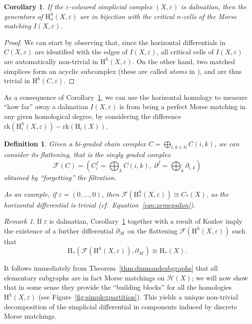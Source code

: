\documentclass[11pt, a4paper, reqno, twoside, makeidx]{amsart}
\theoremstyle{remark}
\newtheorem{rmk}{Remark}[section]
\theoremstyle{plain}
\newtheorem{defi}[thm]{Definition}
\newtheorem{cor}[thm]{Corollary}
\theoremstyle{definition}
\newcommand{\N}{\mathbb{N}}
\newcommand{\HH}{\mathrm{H}}
\newcommand{\hasse}{\mathcal{H}(X)}
\begin{document}
\begin{cor}\label{cor:criticalpoints}
If the $\varepsilon$-coloured simplicial complex $(X, \varepsilon)$ is dalmatian, then the generators of $\HH^h_n(X, \varepsilon)$ are in bijection with the critical $n$-cells of the Morse matching $I(X,\varepsilon)$.
\end{cor}
\begin{proof}
We can start by observing that, since the horizontal differentials in $C(X, \varepsilon)$ are identified with the edges of $I(X, \varepsilon)$, all critical cells of $I(X, \varepsilon)$ are automatically non-trivial in $\HH^h(X, \varepsilon)$. On the other hand, two matched simplices form an acyclic subcomplex (these are called \emph{atoms} in \cite[Ch.~11.3.2]{kozlov2007combinatorial}), and are thus trivial in $\HH^h(C, \varepsilon)$.
\end{proof}
As a consequence of Corollary~\ref{cor:criticalpoints}, we can use the horizontal homology to measure ``how far'' away a dalmatian $I(X, \varepsilon)$ is from being a perfect Morse matching in any given homological degree, by considering the difference $\mathrm{rk}(\HH^h_i(X, \varepsilon)) - \mathrm{rk}(\HH_i(X))$.

\begin{defi}\label{def:flattening}
Given a bi-graded chain complex $C = \bigoplus_{i,k \in \N} C(i,k)$, we can consider its \emph{flattening}, that is the singly graded complex $$\mathcal{F}(C) = \left( C^f_i = \bigoplus_k C(i,k),\; \partial^f =  \bigoplus_k \partial_{i,k}\right)$$
obtained by ``forgetting'' the filtration. 

As an example, if $\varepsilon = (0, \ldots,0)$, then $\mathcal{F}(\HH^h_*(X, \varepsilon)) \cong C_*(X)$, as the horizontal differential is trivial (\emph{cf.}~Equation~\eqref{eqn:zeroepsilon}).
\end{defi}

\begin{rmk}
If $\varepsilon$ is dalmatian, Corollary~\ref{cor:criticalpoints} together with a result of Kozlov \cite[Thm.~11.24]{kozlov2007combinatorial} imply the existence of a further differential $\partial_{\mathcal{M}}$ on the flattening  $\mathcal{F}(\HH^h(X, \varepsilon))$ such that $$\HH_*\left( \mathcal{F}(\HH^h(X, \varepsilon)), \partial_{\mathcal{M}} \right) \cong \HH_*(X).$$
\end{rmk}


It follows immediately from Theorem~\ref{thm:dmmandsubgraphs} that all elementary subgraphs are in fact Morse matchings on $\hasse$; we will now show that in some sense they provide the ``building blocks'' for all the homologies $\HH^h(X, \varepsilon)$ (see Figure~\ref{fig:simplexpartition}). This yields a unique non-trivial decomposition of the simplicial differential in components induced by discrete Morse matchings. 
\end{document}
